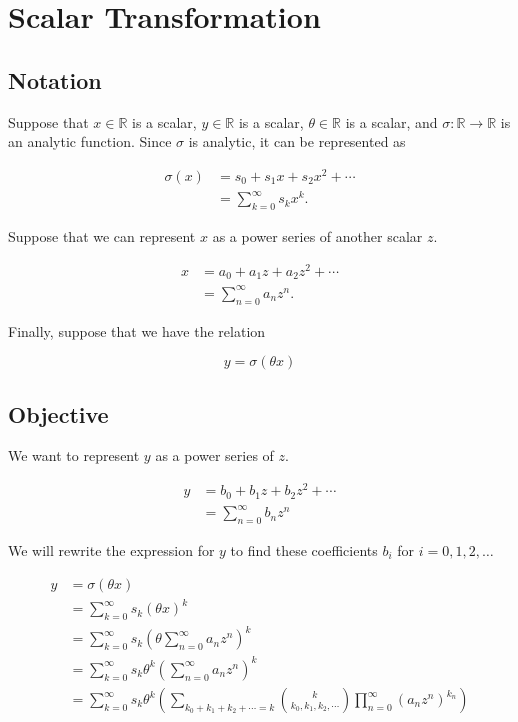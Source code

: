 \section{Scalar Transformation}

\subsection{Notation}
Suppose that $x \in \mathbb{R}$ is a scalar, $y \in \mathbb{R}$ is a scalar, $\theta \in \mathbb{R}$ is a scalar, and $\sigma: \mathbb{R} \to \mathbb{R}$ is an analytic function. Since $\sigma$ is analytic, it can be represented as

\begin{align*}
    \sigma(x)
    &= s_0 + s_1 x + s_2 x^2 + \cdots \\
    &= \sum_{k=0}^{\infty} s_{k} x^{k}.
\end{align*}

Suppose that we can represent $x$ as a power series of another scalar $z$.

\begin{align*}
    x
    &= a_0 + a_1 z + a_2 z^2 + \cdots \\
    &= \sum_{n=0}^{\infty} a_{n} z^{n}.
\end{align*}

Finally, suppose that we have the relation

\begin{equation*}
    y = \sigma(\theta x)
\end{equation*}

\subsection{Objective}
We want to represent $y$ as a power series of $z$.

\begin{align*}
    y
    &= b_0 + b_1 z + b_2 z^2 + \cdots \\
    &= \sum_{n=0}^{\infty} b_{n} z^{n}
\end{align*}

We will rewrite the expression for $y$ to find these coefficients $b_i$ for $i = 0, 1, 2, \ldots$

\begin{align*}
    y
    &= \sigma(\theta x) \\
    &= \sum_{k=0}^{\infty} s_k (\theta x)^k \\
    &= \sum_{k=0}^{\infty} s_k \left(\theta \sum_{n=0}^{\infty} a_{n} z^{n}\right)^{k} \\
    &= \sum_{k=0}^{\infty} s_k \theta^k \left(\sum_{n=0}^{\infty} a_{n} z^{n}\right)^{k} \\
    &= \sum_{k=0}^{\infty} s_k \theta^k \left(\sum_{k_0 + k_1 + k_2 + \cdots = k} \binom{k}{k_0, k_1, k_2, \cdots} \prod_{n=0}^{\infty} (a_n z^{n})^{k_n} \right)
\end{align*}

